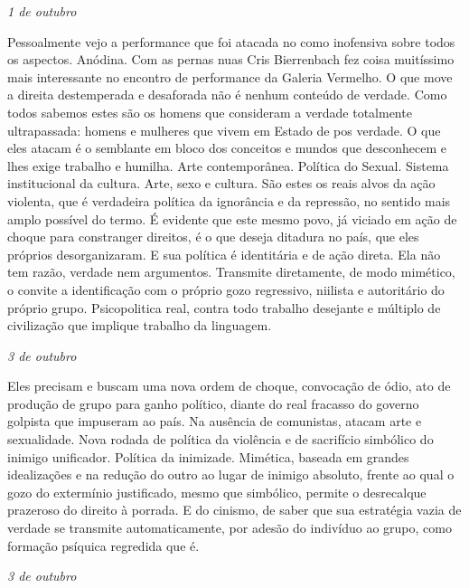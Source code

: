 \begin{flushright}
\emph{1 de outubro}
\end{flushright}

Pessoalmente vejo a performance que foi atacada no  como inofensiva
sobre todos os aspectos. Anódina. Com as pernas nuas Cris Bierrenbach
fez coisa muitíssimo mais interessante no encontro de performance da
Galeria Vermelho. O que move a direita destemperada e desaforada não é
nenhum conteúdo de verdade. Como todos sabemos estes são os homens que
consideram a verdade totalmente ultrapassada: homens e mulheres que
vivem em Estado de pos verdade. O que eles atacam é o semblante em bloco
dos conceitos e mundos que desconhecem e lhes exige trabalho e humilha.
Arte contemporânea. Política do Sexual. Sistema institucional da
cultura. Arte, sexo e cultura. São estes os reais alvos da ação
violenta, que é verdadeira política da ignorância e da repressão, no
sentido mais amplo possível do termo. É evidente que este mesmo povo, já
viciado em ação de choque para constranger direitos, é o que deseja
ditadura no país, que eles próprios desorganizaram. E sua política é
identitária e de ação direta. Ela não tem razão, verdade nem argumentos.
Transmite diretamente, de modo mimético, o convite a identificação com o
próprio gozo regressivo, niilista e autoritário do próprio grupo.
Psicopolitica real, contra todo trabalho desejante e múltiplo de
civilização que implique trabalho da linguagem.

\begin{flushright}
\emph{3 de outubro}
\end{flushright}

Eles precisam e buscam uma nova ordem de choque, convocação de ódio, ato
de produção de grupo para ganho político, diante do real fracasso do
governo golpista que impuseram ao país. Na ausência de comunistas,
atacam arte e sexualidade. Nova rodada de política da violência e de
sacrifício simbólico do inimigo unificador. Política da inimizade.
Mimética, baseada em grandes idealizações e na redução do outro ao lugar
de inimigo absoluto, frente ao qual o gozo do extermínio justificado,
mesmo que simbólico, permite o desrecalque prazeroso do direito à
porrada. E do cinismo, de saber que sua estratégia vazia de verdade se
transmite automaticamente, por adesão do indivíduo ao grupo, como
formação psíquica regredida que é.

\begin{flushright}
\emph{3 de outubro}
\end{flushright}

